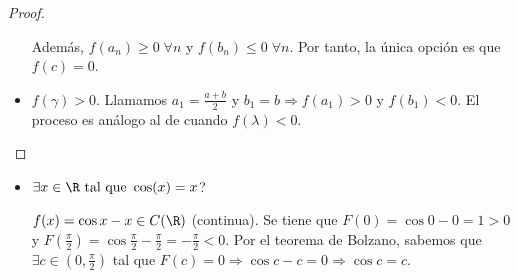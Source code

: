 \begin{proof}
\begin{itemize}
		      Además, \(f(a_n) \geq 0 \; \forall n \) y \(f(b_n ) \leq 0 \;\forall n \). Por tanto, la única opción es que \(f(c) = 0 \).
		\item \(f(\gamma ) > 0 \). Llamamos \(a_1 = \frac{a+ b }{2} \) y \(b_1 = b \Rightarrow f(a_1) > 0\) y \(f(b_1) < 0 \). El proceso es análogo al de cuando \(f(\lambda) < 0 \).
	\end{itemize}
\end{proof}

\begin{example}
	\begin{itemize}
		\item \(\exists x \in \R \text{ tal que } \cos (x ) = x \)?

		      \(f(x) = \cos x - x \in C(\R )\) (continua). Se tiene que
		      \(F(0) = \cos 0  - 0 = 1 > 0\) y \(F(\frac{\pi}{2}) = \cos \frac{\pi}{2} - \frac{\pi}{2} = - \frac{\pi}{2} < 0 \). Por el teorema de Bolzano, sabemos que \(\exists c \in (0, \frac{\pi}{2})\) tal que \(F(c) = 0 \Rightarrow \cos c - c = 0 \Rightarrow \cos  c = c \).

	\end{itemize}
\end{example}
